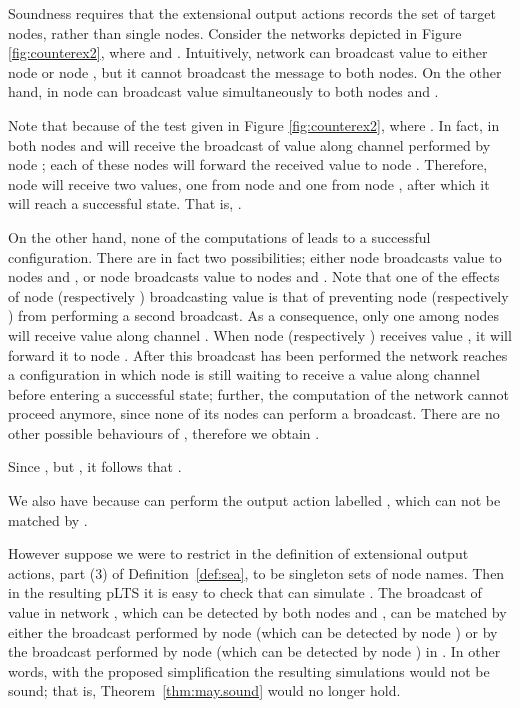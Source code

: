 \documentclass{LMCS}
\begin{document}
\begin{exa}
Soundness requires that the extensional output actions records the set of target nodes, rather than single nodes.
Consider the networks  depicted in Figure \ref{fig:counterex2}, where 
 and 
. 
Intuitively, network  can broadcast value  to either node  or node , 
but it cannot broadcast the message to both nodes. On the other hand, in  node  can 
broadcast value  simultaneously to both nodes  and .

Note that 
 because of the test
 given in Figure \ref{fig:counterex2}, where . 
In fact, in  both nodes  and  will receive the broadcast of value  along channel 
 performed by node ; 
each of these nodes will forward the received value to node . Therefore, node  will receive two values, one 
from node  and one from node , after which it will reach a successful state. That is, 
.

On the other hand, none of the 
computations of  leads to a successful configuration. 
There are in fact two possibilities; either node  broadcasts value  
to nodes  and , or node  broadcasts value  to nodes  
and .  Note that one of the effects of  node  (respectively ) broadcasting value 
 is that of preventing node  (respectively ) from performing a second 
broadcast. 
As a consequence, only one among nodes  will receive value  
along channel . When node  (respectively ) receives value , it will 
forward it to node . After this broadcast has been performed the network 
reaches a configuration in which node  is still waiting to receive a 
value along channel  before entering a successful state; further, 
the computation of the network cannot proceed anymore, 
since none of its nodes can perform a broadcast.
There are no other possible behaviours of 
, therefore we obtain . 

Since , but , 
it follows that .


We also have  because  can perform the output action labelled
, which can not be matched by . 

However suppose we were to restrict  in the definition of
extensional output actions, part (3) of Definition~\ref{def:sea}, to be
singleton sets of node names. Then in the resulting pLTS it is easy to
check that  can simulate . 
The broadcast of value  in network , which can be detected by both 
nodes  and , can be matched by either the broadcast performed by node  
(which can be detected by node ) or by the broadcast 
performed by node  (which can be detected by node ) in .
In other words, with the proposed 
simplification the resulting simulations would not be sound; that
is, Theorem~\ref{thm:may.sound} would no longer hold.
\end{exa}
\end{document}

